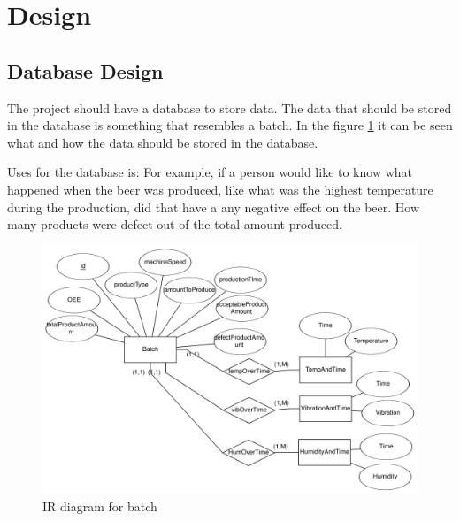 \section{Design}

\subsection{Database Design}
The project should have a database to store data. 
The data that should be stored in the database is something that 
resembles a batch. In the figure \ref{figure:eer_diagram_batch} it can be seen
what and how the data should be stored in the database.

Uses for the database is:
For example, if a person would like to 
know what happened when the beer was produced,
like what was the highest temperature during the production, did that have a
any negative effect on the beer.
How many products were defect out of the total amount produced. 

\begin{figure}[ht]
\centering 
\includegraphics[width=0.8\linewidth]{images/eer_diagrams/database_EER_batch.png}
\caption{IR diagram for batch} 
\label{figure:eer_diagram_batch}
\end{figure}
